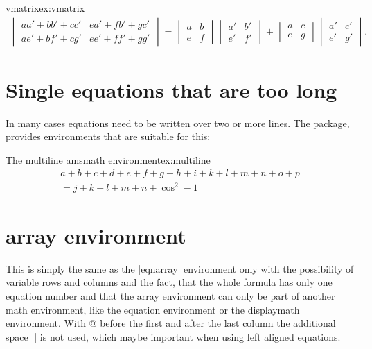 {{{\begin{texexample}{vmatrix}{ex:vmatrix}
\begin{gather}
\begin{vmatrix}
aa' + bb' + cc' & ea' + fb' + gc' \\
ae' + bf' + cg' & ee' + ff' + gg'
\end{vmatrix}
{} = \begin{vmatrix}
a & b \\
e & f
\end{vmatrix}  \begin{vmatrix}
a' & b' \\
e' & f'
\end{vmatrix} + \begin{vmatrix}
a & c \\
e & g
\end{vmatrix}  \begin{vmatrix}
a' & c' \\
e' & g'
\end{vmatrix}.
\end{gather}
\end{texexample}





\section{Single equations that are too long}

In many cases equations need to be written over two or more lines. The  package, provides environments that are suitable for this:


\begin{texexample}{The multiline amsmath environment}{ex:multiline}
\begin{multline}
   a + b + c + d + e + f+ g + h + i  + k + l + m + n + o + p\\
              = j + k + l + m + n +\cos^{2}-1
\end{multline}
\end{texexample}



\section{array environment}

This is simply the same as the |eqnarray| environment only with the possibility of
variable rows and columns and the fact, that the whole formula has only one
equation number and that the array environment can only be part of another math
environment, like the equation environment or the displaymath environment. With
@{} before the first and after the last column the additional space |\arraycolsep| is
not used, which maybe important when using left aligned equations.

}}}
